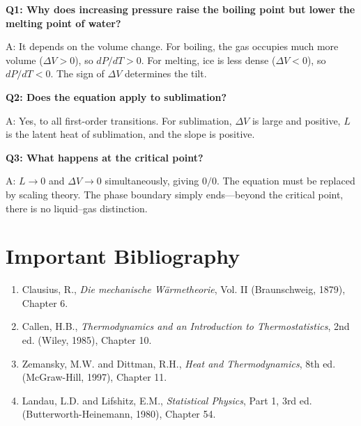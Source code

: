 \textbf{Q1: Why does increasing pressure raise the boiling point but lower the melting point of water?}

A: It depends on the volume change. For boiling, the gas occupies much more volume ($\Delta V > 0$), so $dP/dT > 0$. For melting, ice is less dense ($\Delta V < 0$), so $dP/dT < 0$. The sign of $\Delta V$ determines the tilt.

\textbf{Q2: Does the equation apply to sublimation?}

A: Yes, to all first-order transitions. For sublimation, $\Delta V$ is large and positive, $L$ is the latent heat of sublimation, and the slope is positive.

\textbf{Q3: What happens at the critical point?}

A: $L \to 0$ and $\Delta V \to 0$ simultaneously, giving $0/0$. The equation must be replaced by scaling theory. The phase boundary simply ends---beyond the critical point, there is no liquid--gas distinction.
\section*{Important Bibliography}

\begin{enumerate}
\item Clausius, R., \textit{Die mechanische W\"armetheorie}, Vol. II (Braunschweig, 1879), Chapter 6.
\item Callen, H.B., \textit{Thermodynamics and an Introduction to Thermostatistics}, 2nd ed. (Wiley, 1985), Chapter 10.
\item Zemansky, M.W. and Dittman, R.H., \textit{Heat and Thermodynamics}, 8th ed. (McGraw-Hill, 1997), Chapter 11.
\item Landau, L.D. and Lifshitz, E.M., \textit{Statistical Physics}, Part 1, 3rd ed. (Butterworth-Heinemann, 1980), Chapter 54.
\end{enumerate}

